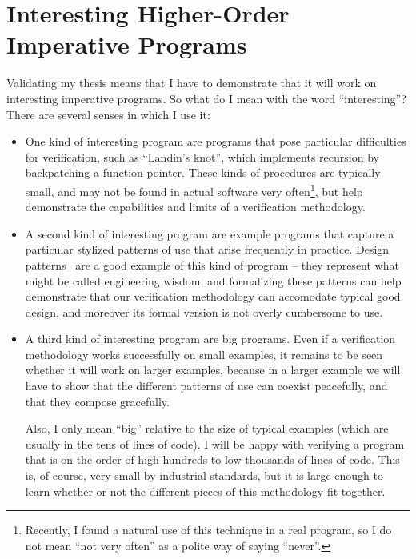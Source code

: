 \section{Interesting Higher-Order Imperative Programs}

Validating my thesis means that I have to demonstrate that it will
work on interesting imperative programs. So what do I mean with the
word ``interesting''? There are several senses in which I use it:

\begin{itemize}
\item One kind of interesting program are programs that pose
  particular difficulties for verification, such as ``Landin's knot'',
  which implements recursion by backpatching a function pointer. These
  kinds of procedures are typically small, and may not be found in
  actual software very often\footnote{Recently, I found a natural use
    of this technique in a real program, so I do not mean ``not very
    often'' as a polite way of saying ``never''.}, but help
  demonstrate the capabilities and limits of a verification
  methodology.

\item A second kind of interesting program are example programs that
  capture a particular stylized patterns of use that arise frequently
  in practice. Design patterns~\cite{gof} are a good example of this
  kind of program -- they represent what might be called engineering
  wisdom, and formalizing these patterns can help demonstrate that our
  verification methodology can accomodate typical good design, and
  moreover its formal version is not overly cumbersome to use. 

\item A third kind of interesting program are big programs. Even if a
  verification methodology works successfully on small examples, it
  remains to be seen whether it will work on larger examples, because
  in a larger example we will have to show that the different patterns
  of use can coexist peacefully, and that they compose gracefully. 

  Also, I only mean ``big'' relative to the size of typical examples
  (which are usually in the tens of lines of code). I will be happy
  with verifying a program that is on the order of high hundreds to
  low thousands of lines of code. This is, of course, very small by
  industrial standards, but it is large enough to learn whether or
  not the different pieces of this methodology fit together. 
\end{itemize}


